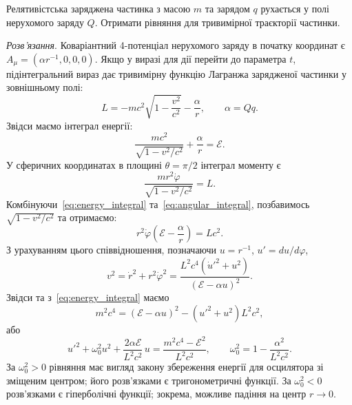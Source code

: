 \begin{problem}
Релятивістська заряджена частинка з масою $m$ та зарядом $q$ рухається у полі нерухомого заряду $Q$. Отримати рівняння для тривимірної траєкторії частинки.

\textit{Розв'язання}. Коваріантний 4-потенціал нерухомого заряду в початку координат є $A_{\mu}=(\alpha r^{-1},0,0,0)$. Якщо у виразі для дії перейти до параметра $t$, підінтегральний вираз дає тривимірну функцію Лагранжа зарядженої частинки у зовнішньому полі:
\[
    L = -mc^2\sqrt{1-\frac{v^2}{c^2}} - \frac{\alpha}{r},
    \qquad \alpha = Qq.
\]
Звідси маємо інтеграл енергії:
\begin{equation}
    \frac{mc^2}{\sqrt{1-v^2/c^2}} + \frac{\alpha}{r} = \mathcal{E}.\label{eq:energy_integral}
\end{equation}
У сферичних координатах в площині $\theta=\pi/2$ інтеграл моменту є
\begin{equation}\label{eq:angular_integral}
    \frac{mr^2\dot{\varphi}}{\sqrt{1-v^2/c^2}} = L.
\end{equation}
Комбінуючи~\eqref{eq:energy_integral} та~\eqref{eq:angular_integral}, позбавимось $\sqrt{1-v^2/c^2}$ та отримаємо:
\begin{equation*}
    r^2\dot{\varphi}\!\left(\mathcal{E} - \frac{\alpha}{r}\right) = Lc^2.
\end{equation*}
З урахуванням цього співвідношення, позначаючи $u=r^{-1}$, $u'=du/d\varphi$,
\begin{equation*}
    v^2 = \dot{r}^2 + r^2\dot{\varphi}^2
    = \frac{L^2c^4(\dot{u}'^2+u^2)}{(\mathcal{E}-\alpha u)^2}.
\end{equation*}
Звідси та з~\eqref{eq:energy_integral} маємо
\begin{equation*}
    m^2c^4 = \left(\mathcal{E}-\alpha u\right)^2
    - (u'^2+u^2){L^2c^2},
\end{equation*}
або
\begin{equation*}
    u'^2 + \omega_0^2 u^2 + \frac{2\alpha\mathcal{E}}{L^2c^2}\,u
    = \frac{m^2c^4-\mathcal{E}^2}{L^2c^2},
    \qquad
    \omega_0^2 = 1 - \frac{\alpha^2}{L^2c^2}.
\end{equation*}
За $\omega_0^2>0$ рівняння має вигляд закону збереження енергії для осцилятора зі зміщеним центром; його розв'язками є тригонометричні функції. За $\omega_0^2<0$ розв'язками є гіперболічні функції; зокрема, можливе падіння на центр $r\to 0$.
\end{problem}

